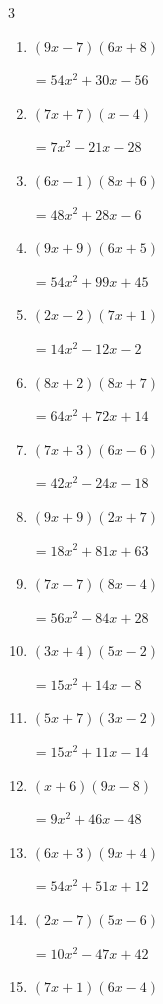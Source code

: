 \begin{multicols}{3}
\begin{enumerate}
        $=8x^{2}-x-9$

\columnbreak %

  \item $(9x-7)(6x+8)$

        $=54x^{2}+30x-56$

  \item $(7x+7)(x-4)$

        $=7x^{2}-21x-28$

  \item $(6x-1)(8x+6)$

        $=48x^{2}+28x-6$

  \item $(9x+9)(6x+5)$

        $=54x^{2}+99x+45$

  \item $(2x-2)(7x+1)$

        $=14x^{2}-12x-2$

  \item $(8x+2)(8x+7)$

        $=64x^{2}+72x+14$

  \item $(7x+3)(6x-6)$

        $=42x^{2}-24x-18$

  \item $(9x+9)(2x+7)$

        $=18x^{2}+81x+63$

  \item $(7x-7)(8x-4)$

        $=56x^{2}-84x+28$

  \item $(3x+4)(5x-2)$

        $=15x^{2}+14x-8$

  \item $(5x+7)(3x-2)$

        $=15x^{2}+11x-14$

  \item $(x+6)(9x-8)$

        $=9x^{2}+46x-48$

  \item $(6x+3)(9x+4)$

        $=54x^{2}+51x+12$

  \item $(2x-7)(5x-6)$

        $=10x^{2}-47x+42$

  \item $(7x+1)(6x-4)$


\end{enumerate}
\end{multicols}
